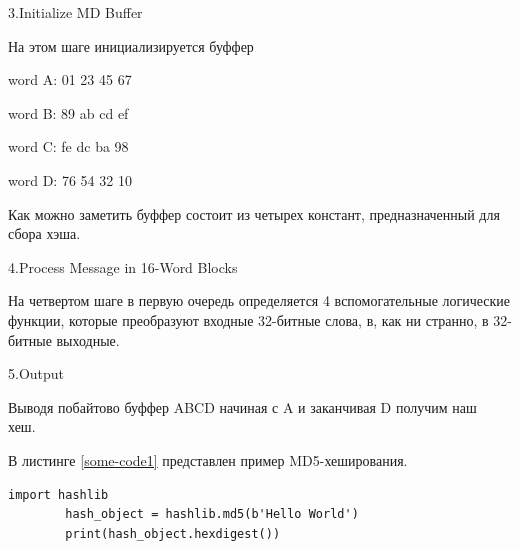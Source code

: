 \documentclass[a4paper, 12pt, oneside]{scrartcl}
\begin{document}
	3.Initialize MD Buffer\par
	На этом шаге инициализируется буффер\par
	word A: 01 23 45 67\par
	word B: 89 ab cd ef\par
	word C: fe dc ba 98\par
	word D: 76 54 32 10\par
	Как можно заметить буффер состоит из четырех констант, предназначенный для сбора хэша.\par
	4.Process Message in 16-Word Blocks\par
	На четвертом шаге в первую очередь определяется 4 вспомогательные логические функции, которые преобразуют входные 32-битные слова, в, как ни странно, в 32-битные выходные.\par

	5.Output\par
	Выводя побайтово буффер ABCD начиная с A и заканчивая D получим наш хеш.~\cite{md2}\par
	В листинге \ref{some-code1} представлен пример MD5-хеширования.\par
	
	\begin{lstlisting}[label=some-code1,caption= MD5]
		import hashlib
		hash_object = hashlib.md5(b'Hello World')
		print(hash_object.hexdigest())
	\end{lstlisting}
\end{document}

